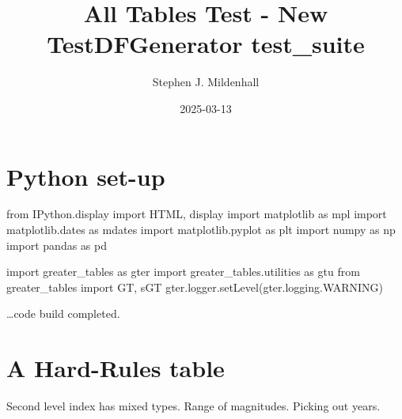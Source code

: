 \documentclass[
  12pt,
  a4paper,
  DIV=11,
  numbers=noendperiod]{scrartcl}
\title{All Tables Test - New TestDFGenerator test\_suite}
\author{Stephen J. Mildenhall}
\date{2025-03-13}
\newenvironment{Shaded}{\begin{snugshade}}{\end{snugshade}}
\newcommand{\ImportTok}[1]{\textcolor[rgb]{0.00,0.46,0.62}{#1}}
\newcommand{\NormalTok}[1]{\textcolor[rgb]{0.00,0.23,0.31}{#1}}
\begin{document}
\maketitle


\section{Python set-up}\label{python-set-up}

\label{setup}
\begin{Shaded}
\begin{Highlighting}[]
\ImportTok{from}\NormalTok{ IPython.display }\ImportTok{import}\NormalTok{ HTML, display}
\ImportTok{import}\NormalTok{ matplotlib }\ImportTok{as}\NormalTok{ mpl}
\ImportTok{import}\NormalTok{ matplotlib.dates }\ImportTok{as}\NormalTok{ mdates}
\ImportTok{import}\NormalTok{ matplotlib.pyplot }\ImportTok{as}\NormalTok{ plt}
\ImportTok{import}\NormalTok{ numpy }\ImportTok{as}\NormalTok{ np}
\ImportTok{import}\NormalTok{ pandas }\ImportTok{as}\NormalTok{ pd}

\ImportTok{import}\NormalTok{ greater\_tables }\ImportTok{as}\NormalTok{ gter}
\ImportTok{import}\NormalTok{ greater\_tables.utilities }\ImportTok{as}\NormalTok{ gtu}
\ImportTok{from}\NormalTok{ greater\_tables }\ImportTok{import}\NormalTok{ GT, sGT}
\NormalTok{gter.logger.setLevel(gter.logging.WARNING)}
\end{Highlighting}
\end{Shaded}

\ldots code build completed.

\section{A Hard-Rules table}\label{a-hard-rules-table}

Second level index has mixed types. Range of magnitudes. Picking out
years.
\end{document}
